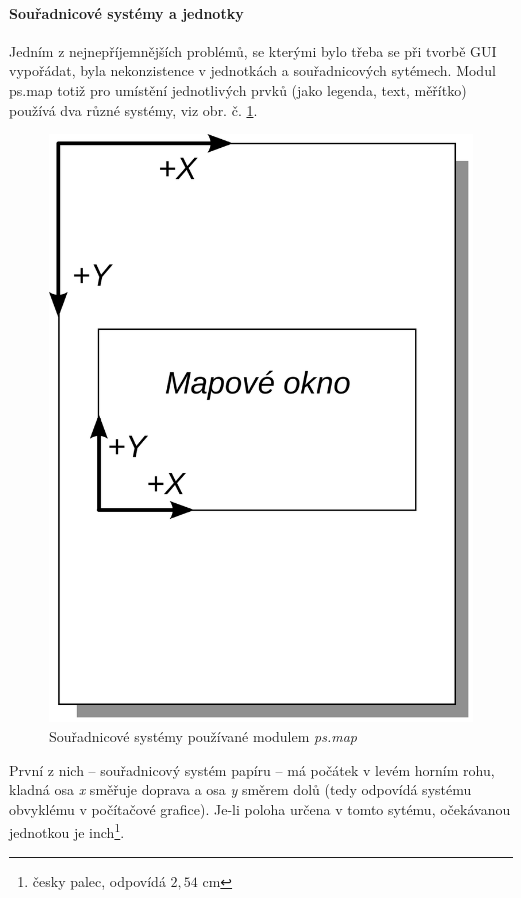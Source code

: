\documentclass[a4paper,12pt,draft]{article}
\newcommand{\modul}[1]{\emph{#1}}
\begin{document}
{\paragraph*{Souřadnicové systémy a jednotky}
\label{sec:psmap:sour_systemy}
Jedním z nejnepříjemnějších problémů, se kterými bylo třeba se při
tvorbě GUI vypořádat, byla nekonzistence v jednotkách a souřadnicových
sytémech. Modul ps.map totiž pro umístění jednotlivých prvků
(jako legenda, text, měřítko) používá dva různé systémy, viz
obr. č. \ref{fig:sour_systemy}.

\begin{figure}[h!]
    \centering
    \includegraphics[width=0.2\textheight]{sour_systemy.pdf}
    \caption{Souřadnicové systémy používané modulem
    \modul{ps.map}\label{fig:sour_systemy}}
\end{figure}


První z nich -- souřadnicový systém papíru -- má počátek v levém
horním rohu, kladná osa \emph{x} směřuje doprava a osa \emph{y} směrem
dolů (tedy odpovídá systému obvyklému v počítačové grafice).
Je-li poloha určena v tomto sytému, očekávanou jednotkou je inch\footnote{
česky palec, odpovídá $2{,}54$ cm}.

}
\end{document}
